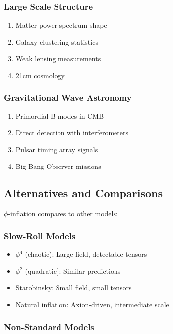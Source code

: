 \subsubsection{Large Scale Structure}

\begin{enumerate}
\item Matter power spectrum shape
\item Galaxy clustering statistics
\item Weak lensing measurements
\item 21cm cosmology
\end{enumerate}

\subsubsection{Gravitational Wave Astronomy}

\begin{enumerate}
\item Primordial B-modes in CMB
\item Direct detection with interferometers
\item Pulsar timing array signals
\item Big Bang Observer missions
\end{enumerate}

\subsection{Alternatives and Comparisons}

$\phi$-inflation compares to other models:

\subsubsection{Slow-Roll Models}

\begin{itemize}
\item $\phi^4$ (chaotic): Large field, detectable tensors
\item $\phi^2$ (quadratic): Similar predictions
\item Starobinsky: Small field, small tensors
\item Natural inflation: Axion-driven, intermediate scale
\end{itemize}

\subsubsection{Non-Standard Models}

